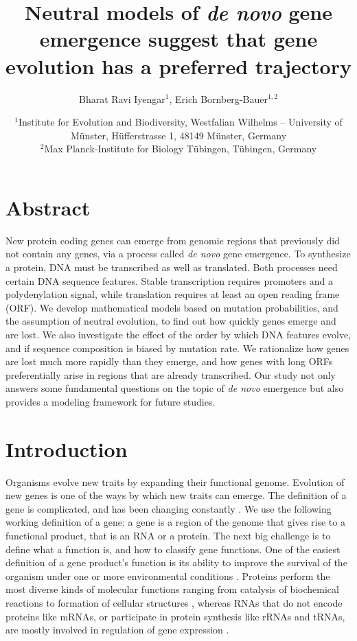 \documentclass[12pt,a4paper]{article}
\title{Neutral models of \textit{de novo} gene emergence suggest that gene evolution has a preferred trajectory}
\author{Bharat Ravi Iyengar$^1$, Erich Bornberg-Bauer$^{1,2}$}
\date{\small $^1$Institute for Evolution and Biodiversity, Westfalian Wilhelms -- University of M\"{u}nster, H\"{u}fferstrasse 1, 48149 M\"{u}nster, Germany\\ $^2$Max Planck-Institute for Biology T\"{u}bingen, T\"{u}bingen, Germany}
\begin{document}
\onehalfspacing

\setlength{\abovedisplayskip}{0pt}
\setlength{\belowdisplayskip}{1em}

\maketitle


\linenumbers

\section*{Abstract}
New protein coding genes can emerge from genomic regions that previously did not contain any genes, via a process called \textit{de novo} gene emergence. To synthesize a protein, DNA must be transcribed as well as translated. Both processes need certain DNA sequence features. Stable transcription requires promoters and a polydenylation signal, while translation requires at least an open reading frame (ORF). We develop mathematical models based on mutation probabilities, and the assumption of neutral evolution, to find out how quickly genes emerge and are lost. We also investigate the effect of the order by which DNA features evolve, and if sequence composition is biased by mutation rate. We rationalize how genes are lost much more rapidly than they emerge, and how genes with long ORFs preferentially arise in regions that are already transcribed. Our study not only answers some fundamental questions on the topic of \textit{de novo} emergence but also provides a modeling framework for future studies.



\section{Introduction}

Organisms evolve new traits by expanding their functional genome. Evolution of new genes is one of the ways by which new traits can emerge. The definition of a gene is complicated, and has been changing constantly \citep{genepostencode}. We use the following working definition of a gene: a gene is a region of the genome that gives rise to a functional product, that is an RNA or a protein. The next big challenge is to define what a function is, and how to classify gene functions. One of the easiest definition of a gene product's function is its ability to improve the survival of the organism under one or more environmental conditions \citep{deNovoFunction}. Proteins perform the most diverse kinds of molecular functions ranging from catalysis of biochemical reactions to formation of cellular structures \citep{berg}, whereas RNAs that do not encode proteins like mRNAs, or participate in protein synthesis like rRNAs and tRNAs, are mostly involved in regulation of gene expression \citep{fncel,Statello2021}.
\end{document}
